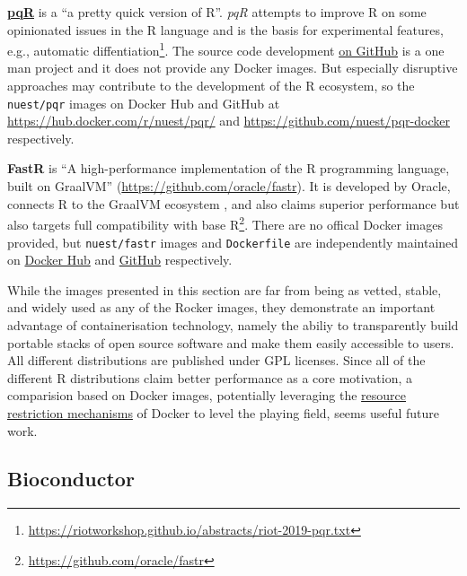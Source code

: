 \textbf{\href{http://www.pqr-project.org/}{pqR}} is a ``a pretty quick
version of R''. \emph{pqR} attempts to improve R on some opinionated
issues in the R language and is the basis for experimental features,
e.g., automatic
diffentiation\footnote{\href{https://riotworkshop.github.io/abstracts/riot-2019-pqr.txt}{https://riotworkshop.github.io/abstracts/riot-2019-pqr.txt}}.
The source code development
\href{https://github.com/radfordneal/pqR/}{on GitHub} is a one man
project and it does not provide any Docker images. But especially
disruptive approaches may contribute to the development of the R
ecosystem, so the \texttt{nuest/pqr} images on Docker Hub and GitHub at
\url{https://hub.docker.com/r/nuest/pqr/} and
\url{https://github.com/nuest/pqr-docker} respectively.

\textbf{FastR} is ``A high-performance implementation of the R
programming language, built on GraalVM''
(\url{https://github.com/oracle/fastr}). It is developed by Oracle,
connects R to the GraalVM ecosystem \citep{wikipedia_graalvm_2019}, and
also claims superior performance but also targets full compatibility
with base
R\footnote{\href{https://github.com/oracle/fastr}{https://github.com/oracle/fastr}}.
There are no offical Docker images provided, but \texttt{nuest/fastr}
images and \texttt{Dockerfile} are independently maintained on
\href{https://cloud.docker.com/repository/docker/nuest/fastr/}{Docker
Hub} and \href{https://github.com/nuest/fastr-docker}{GitHub}
respectively.

While the images presented in this section are far from being as vetted,
stable, and widely used as any of the Rocker images, they demonstrate an
important advantage of containerisation technology, namely the abiliy to
transparently build portable stacks of open source software and make
them easily accessible to users. All different distributions are
published under GPL licenses. Since all of the different R distributions
claim better performance as a core motivation, a comparision based on
Docker images, potentially leveraging the
\href{https://docs.docker.com/config/containers/resource_constraints/}{resource
restriction mechanisms} of Docker to level the playing field, seems
useful future work.

\hypertarget{bioconductor}{%
\subsection{Bioconductor}\label{bioconductor}}

